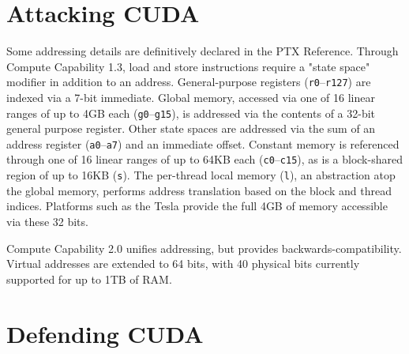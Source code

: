 \documentclass[letterpaper,10pt]{article}
\begin{document}
\begin{multicols}{2}
\section{Attacking CUDA}
Some addressing details are definitively declared in the PTX Reference\cite{ptxguide}.
Through Compute Capability 1.3, load and store instructions require a "state space"
modifier in addition to an address. General-purpose registers (\texttt{r0}--\texttt{r127}) are
indexed via a 7-bit immediate. Global memory, accessed via one of 16 linear ranges
of up to 4GB each (\texttt{g0}--\texttt{g15}), is addressed via the
contents of a 32-bit general purpose register. Other state spaces are addressed
via the sum of an address register (\texttt{a0}--\texttt{a7}) and an immediate
offset. Constant memory is referenced through one of 16 linear ranges of up to
64KB each (\texttt{c0}--\texttt{c15}), as is a block-shared region of up to 16KB
(\texttt{s}). The per-thread local memory (\texttt{l}), an abstraction atop the
global memory, performs address translation based on the block and thread indices.
Platforms such as the Tesla\textsuperscript{\texttrademark} provide the full 
4GB of memory accessible via these 32 bits.

Compute Capability 2.0 unifies addressing, but provides backwards-compatibility.
Virtual addresses are extended to 64 bits, with 40 physical bits currently
supported for up to 1TB of RAM.
\section{Defending CUDA}


\end{multicols}
\end{document}
